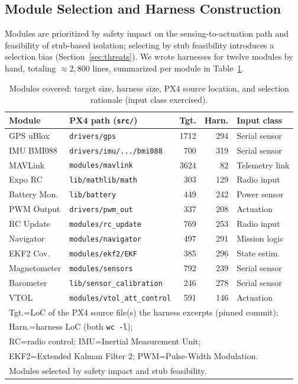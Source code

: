 \documentclass[conference]{IEEEtran}
\newcommand{\entra}[1]{#1}
\begin{document}
\subsection{Module Selection and Harness Construction}
\label{subsec:harnesses}
Modules are prioritized by safety impact on the sensing-to-actuation
path and feasibility of stub-based isolation; selecting by stub
feasibility introduces a selection bias (Section~\ref{sec:threats}).
We wrote harnesses for twelve modules by hand, totaling
${\approx}2{,}800$ lines, summarized
per module in Table~\ref{tab:benchmarks}.

\begin{table}[t]
\centering
\caption{Modules covered: target size, harness size, PX4 source
location, and selection rationale (input class exercised).}
\label{tab:benchmarks}
\scriptsize
\setlength{\tabcolsep}{3pt}
\begin{tabular}{@{}llrrl@{}}
\toprule
\textbf{Module} & \textbf{PX4 path (\texttt{src/})} & \textbf{Tgt.} & \textbf{Harn.} & \textbf{Input class}\\
\midrule
GPS uBlox      & \texttt{drivers/gps}          & 1712 & 294 & Serial sensor \\
IMU BMI088     & \texttt{drivers/imu/.../bmi088} & 700 & 319 & Serial sensor \\
MAVLink        & \texttt{modules/mavlink}       & 3624 & 82 & Telemetry link \\
Expo RC        & \texttt{lib/mathlib/math}      & 303 & 129 & Radio input \\
Battery Mon.   & \texttt{lib/battery}           & 449 & 242 & Power sensor \\
PWM Output        & \texttt{drivers/pwm\_out}      & 337 & 208 & Actuation \\
RC Update      & \texttt{modules/rc\_update}     & 769 & 253 & Radio input \\
Navigator      & \texttt{modules/navigator}     & 497 & 291 & Mission logic \\
EKF2 Cov.      & \texttt{modules/ekf2/EKF}      & 385 & 296 & State estim. \\
Magnetometer   & \texttt{modules/sensors}       & 792 & 239 & Serial sensor \\
Barometer      & \texttt{lib/sensor\_calibration} & 246 & 278 & Serial sensor \\
VTOL           & \texttt{modules/vtol\_att\_control} & 591 & 146 & Actuation \\
\bottomrule
\multicolumn{5}{l}{Tgt.=LoC of the PX4 source file(s) the harness excerpts (pinned commit);}\\
\multicolumn{5}{l}{Harn.=harness LoC (both \texttt{wc\,-l});}\\
\multicolumn{5}{l}{\entra{RC=radio control; IMU=Inertial Measurement Unit;}}\\
\multicolumn{5}{l}{\entra{EKF2=Extended Kalman Filter 2; PWM=Pulse-Width Modulation.}}\\
\multicolumn{5}{l}{Modules selected by safety impact and stub feasibility.}
\end{tabular}
\end{table}
\end{document}
